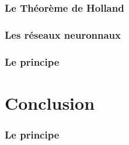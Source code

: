 \documentclass[10pt]{beamer}
\begin{document}
\begin{frame}
  \frametitle{Le Théorème de Holland}
  \end{frame}

\subsubsection{Les réseaux neuronnaux}

\begin{frame}
  \frametitle{Le principe}
  \end{frame}

\section{Conclusion}

\begin{frame}
  \frametitle{Le principe}
  \end{frame}
\end{document}
